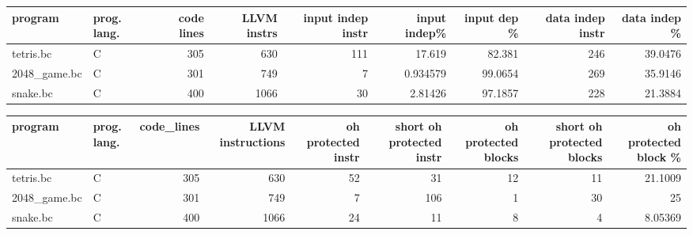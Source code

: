 \begin{table}[ht]
\centering
\begin{adjustbox}{width=1.3\textwidth}
\begin{tabular}{llrrrrrrr}
\hline
 program& prog. lang.   &   code lines &   LLVM instrs &   input indep instr &   input indep\% &   input dep \% &   data indep instr &   data indep \% \\
\hline
 tetris.bc    & C             &          305 &           630 &                 111 &      17.619    &       82.381  &                246 &        39.0476 \\
 2048\_game.bc & C             &          301 &           749 &                   7 &       0.934579 &       99.0654 &                269 &        35.9146 \\
 snake.bc     & C             &          400 &          1066 &                  30 &       2.81426  &       97.1857 &                228 &        21.3884 \\
\hline
\end{tabular}
\end{adjustbox}
\end{table}

\begin{table}[ht]
\centering
\begin{adjustbox}{width=1.3\textwidth}
\begin{tabular}{llrrrrrrr}
\hline
 program      & prog. lang.   &   code\_lines &   LLVM instructions &   oh protected instr &   short oh protected instr &   oh protected blocks &   short oh protected blocks &   oh protected block \% \\
\hline
 tetris.bc    & C             &          305 &                 630 &                   52 &                         31 &                    12 &                          11 &               21.1009  \\
 2048\_game.bc & C             &          301 &                 749 &                    7 &                        106 &                     1 &                          30 &               25       \\
 snake.bc     & C             &          400 &                1066 &                   24 &                         11 &                     8 &                           4 &                8.05369 \\
\hline
\end{tabular}
\end{adjustbox}
\end{table}
